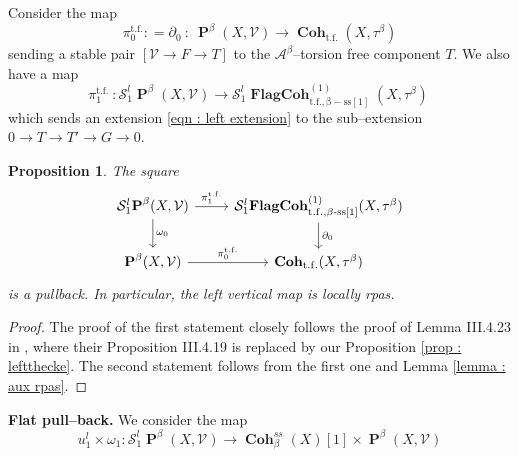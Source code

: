 \documentclass[11pt]{article}
\newtheorem{proposition}[theorem]{Proposition}
\newcommand{\segal}{\mathcal{S}}
\newcommand{\abeta}{\mathcal{A}^{\beta}}
\newcommand{\abetatfstack}{\boldsymbol{\operatorname{Coh}}_{\operatorname{t.f.}}(X,\tau^{\beta})}
\newcommand{\cohbetassstack}{\boldsymbol{\operatorname{Coh}}^{ss}_{\beta}(X)}
\newcommand{\framing}{\mathcal{V}}
\newcommand{\pairs}{\boldsymbol{\operatorname{P}}^{\beta}(X,\mathcal{V})}
\newcommand{\pitfzero}{\pi^{\operatorname{t.f.}}_{0}}
\begin{document}
\noindent Consider the map 
    \begin{equation}\label{eqn : pitfzero}
        \pitfzero \colon= \partial_0 \ \colon \ \pairs \longrightarrow \abetatfstack
    \end{equation}
    sending a stable pair $[\framing \rightarrow F \rightarrow T]$ to the $\abeta$--torsion free component $T$. We also have a map
    \[
                \pi_1^{\operatorname{t.f.}} \ \colon \segal_1^l\pairs \longrightarrow \segal_1^l{\boldsymbol{\operatorname{FlagCoh}}}^{(1)}_{\operatorname{t.f.,\beta-ss[1]}}(X,\tau^\beta)\
    \]
    which sends an extension \eqref{eqn : left extension} to the sub--extension $0 \rightarrow T\rightarrow T'\rightarrow G \rightarrow 0$.
    

    \begin{proposition}
        The square
        \begin{equation}\label{eqn : left properness square}
        \begin{tikzcd}
	{\segal_1^l \pairs} & {\segal_1^l}{\boldsymbol{\operatorname{FlagCoh}}}^{(1)}_{\operatorname{t.f.,\beta-ss[1]}}(X,\tau^\beta) \\
	\pairs & \abetatfstack
	\arrow[from=1-1, to=1-2 , "\pi_1^{\operatorname{t.f.}}"]
	\arrow[from=1-1, to=2-1, "\omega_0"]
	\arrow[from=1-2, to=2-2, "\partial_0"]
	\arrow[""{name=0, anchor=center, inner sep=0}, from=2-1, to=2-2, "\pitfzero"]
    \end{tikzcd}
    \end{equation}
    is a pullback. In particular, the left vertical map is locally rpas.
    \end{proposition}
    \begin{proof}
        The proof of the first statement closely follows the proof of Lemma III.4.23 in \cite{dps}, where their Proposition III.4.19 is replaced by our Proposition \ref{prop : leftthecke}. The second statement follows from the first one and Lemma \ref{lemma : aux rpas}.
     \end{proof}

\bigskip

\noindent\textbf{Flat pull--back. }We consider the map
\begin{equation}\label{eqn : left pullback map}
    u_1^l \times \omega_1 \colon  \segal^l_1 \pairs \longrightarrow \cohbetassstack [1] \times \pairs
\end{equation}
\end{document}
